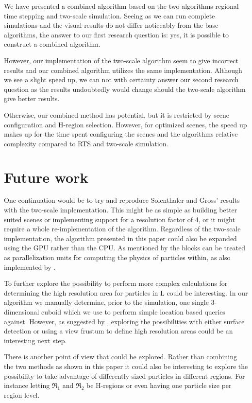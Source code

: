 \documentclass[../../main.tex]{subfiles}
\begin{document}
\tracingall



We have presented a combined algorithm based on the two algorithms regional time stepping and two-scale simulation. Seeing as we can run complete simulations and the visual results do not differ noticeably from the base algorithms, the answer to our first research question is: yes, it is possible to construct a combined algorithm. 

However, our implementation of the two-scale algorithm seem to give incorrect results and our combined algorithm utilizes the same implementation. Although we see a slight speed up, we can not with certainty answer our second research question as the results undoubtedly would change should the two-scale algorithm give better results. 

Otherwise, our combined method has potential, but it is restricted by scene configuration and H-region selection. However, for optimized scenes, the speed up makes up for the time spent configuring the scenes and the algorithms relative complexity compared to RTS and two-scale simulation. 


\section{Future work}

One continuation would be to try and reproduce Solenthaler and Gross' results with the two-scale implementation. This might be as simple as building better suited scenes or implementing support for a resolution factor of 4, or it might require a whole re-implementation of the algorithm. Regardless of the two-scale implementation, the algorithm presented in this paper could also be expanded using the GPU rather than the CPU. As mentioned by \citet{goswami2014regional} the blocks can be treated as parallelization units for computing the physics of particles within, as also implemented by \citet{goswami2010interactive}.

To further explore the possibility to perform more complex calculations for determining the high resolution area for particles in L could be interesting. In our algorithm we manually determine, prior to the simulation, one single 3-dimensional cuboid which we use to perform simple location based queries against. However, as suggested by \citet{solenthaler2011two}, exploring the possibilities with either surface detection or using a view frustum to define high resolution areas could be an interesting next step. 

There is another point of view that could be explored. Rather than combining the two methods as shown in this paper it could also be interesting to explore the possibility to take advantage of differently sized particles in different regions. For instance letting $\Re_1$ and $\Re_2$ be H-regions or even having one particle size per region level. 
\end{document}
